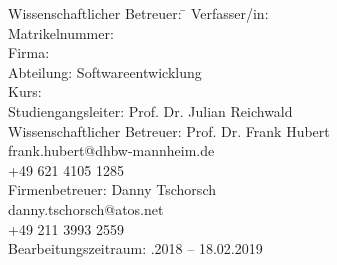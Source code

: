 \begin{titlepage}
\begin{center}
\begin{minipage}{\textwidth}

\begin{tabbing}
	Wissenschaftlicher Betreuer: \hspace{0.85cm}\=\kill
	Verfasser/in: \> \DerAutorDerArbeit \\[1.5mm]
	Matrikelnummer:  \\[1.5mm]
	Firma: \> \DerNameDerFirma  \\[1.5mm]
	Abteilung: \> Softwareentwicklung \\[1.5mm]
	Kurs: \> \DieKursbezeichnung \\[1.5mm]
	Studiengangsleiter: \> Prof. Dr. Julian Reichwald  \\[1.5mm]
	Wissenschaftlicher Betreuer: \> Prof. Dr. Frank Hubert  \\
	\> frank.hubert@dhbw-mannheim.de \\
	\> +49 621 4105 1285 \\[1.5mm]
	Firmenbetreuer: \> Danny Tschorsch \\
	\> danny.tschorsch@atos.net \\
	\> +49 211 3993 2559 \\[1.5mm]
	Bearbeitungszeitraum: .2018 -- 18.02.2019
\end{tabbing}
\end{minipage}

\end{center}

\end{titlepage}